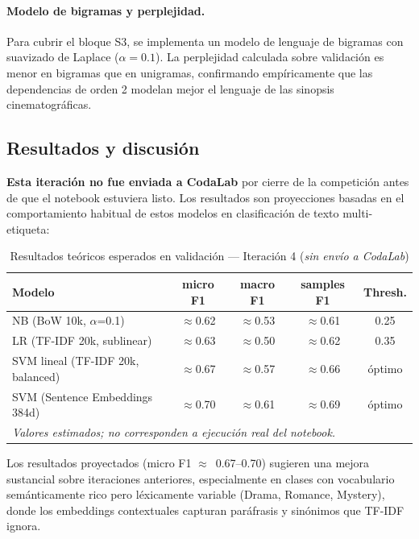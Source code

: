 \documentclass[11pt, a4paper]{article}
\begin{document}
\paragraph{Modelo de bigramas y perplejidad.}
Para cubrir el bloque S3, se implementa un modelo de lenguaje de bigramas con suavizado de Laplace ($\alpha=0.1$). La perplejidad calculada sobre validación es menor en bigramas que en unigramas, confirmando empíricamente que las dependencias de orden 2 modelan mejor el lenguaje de las sinopsis cinematográficas.

\subsection{Resultados y discusión}

\textbf{Esta iteración no fue enviada a CodaLab} por cierre de la competición antes de que el notebook estuviera listo. Los resultados son proyecciones basadas en el comportamiento habitual de estos modelos en clasificación de texto multi-etiqueta:

\begin{table}[H]
\centering
\caption{Resultados teóricos esperados en validación --- Iteración 4 (\textit{sin envío a CodaLab})}
\small
\begin{tabularx}{\textwidth}{Xcccc}
\toprule
\textbf{Modelo} & \textbf{micro F1} & \textbf{macro F1} & \textbf{samples F1} & \textbf{Thresh.} \\
\midrule
NB (BoW 10k, $\alpha$=0.1)            & $\approx$0.62 & $\approx$0.53 & $\approx$0.61 & 0.25 \\
LR (TF-IDF 20k, sublinear)            & $\approx$0.63 & $\approx$0.50 & $\approx$0.62 & 0.35 \\
SVM lineal (TF-IDF 20k, balanced)     & $\approx$0.67 & $\approx$0.57 & $\approx$0.66 & óptimo \\
SVM (Sentence Embeddings 384d)        & $\approx$0.70 & $\approx$0.61 & $\approx$0.69 & óptimo \\
\bottomrule
\multicolumn{5}{p{\dimexpr\textwidth-2\tabcolsep}}{\small \textit{Valores estimados; no corresponden a ejecución real del notebook.}}
\end{tabularx}
\end{table}

Los resultados proyectados (micro F1 $\approx$~0.67--0.70) sugieren una mejora sustancial sobre iteraciones anteriores, especialmente en clases con vocabulario semánticamente rico pero léxicamente variable (Drama, Romance, Mystery), donde los embeddings contextuales capturan paráfrasis y sinónimos que TF-IDF ignora.
\end{document}
